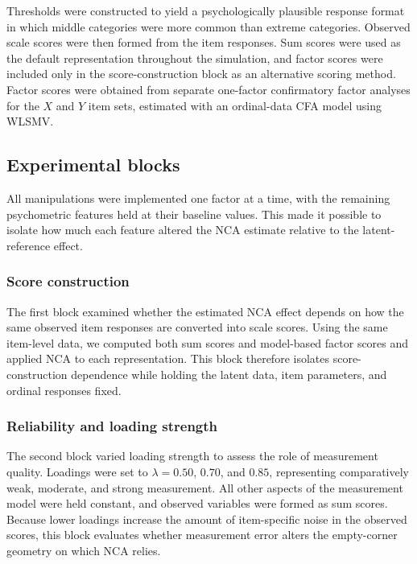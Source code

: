\documentclass[
  man,
  longtable,
  nolmodern,
  notxfonts,
  notimes,
  colorlinks=true,linkcolor=blue,citecolor=blue,urlcolor=blue]{apa7}
\begin{document}
Thresholds were constructed to yield a psychologically plausible
response format in which middle categories were more common than extreme
categories. Observed scale scores were then formed from the item
responses. Sum scores were used as the default representation throughout
the simulation, and factor scores were included only in the
score-construction block as an alternative scoring method. Factor scores
were obtained from separate one-factor confirmatory factor analyses for
the \(X\) and \(Y\) item sets, estimated with an ordinal-data CFA model
using WLSMV.

\subsection{Experimental blocks}\label{experimental-blocks}

All manipulations were implemented one factor at a time, with the
remaining psychometric features held at their baseline values. This made
it possible to isolate how much each feature altered the NCA estimate
relative to the latent-reference effect.

\subsubsection{Score construction}\label{score-construction}

The first block examined whether the estimated NCA effect depends on how
the same observed item responses are converted into scale scores. Using
the same item-level data, we computed both sum scores and model-based
factor scores and applied NCA to each representation. This block
therefore isolates score-construction dependence while holding the
latent data, item parameters, and ordinal responses fixed.

\subsubsection{Reliability and loading
strength}\label{reliability-and-loading-strength}

The second block varied loading strength to assess the role of
measurement quality. Loadings were set to \(\lambda = 0.50\), \(0.70\),
and \(0.85\), representing comparatively weak, moderate, and strong
measurement. All other aspects of the measurement model were held
constant, and observed variables were formed as sum scores. Because
lower loadings increase the amount of item-specific noise in the
observed scores, this block evaluates whether measurement error alters
the empty-corner geometry on which NCA relies.
\end{document}
